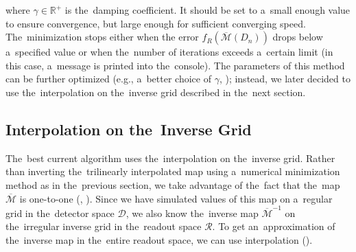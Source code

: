 			where $\gamma\in\mathbb{R}^+$ is the~damping coefficient. It should be set to a~small enough value to ensure convergence, but large enough for sufficient converging speed. The~minimization stops either when the error $f_R(\overbar{\mathcal{M}}(D_n))$ drops below a~specified value or when the~number of iterations exceeds a~certain limit (in this case, a~message is printed into the~console).
			The parameters of this method can be further optimized (e.g., a~better choice of $\gamma$, ); instead, we later decided to use the~interpolation on the~inverse grid described in the~next section.
			
		
		\subsection{Interpolation on the~Inverse Grid}
		\label{sec:interpol}			
			
			The~best current algorithm uses the~interpolation on the~inverse grid. Rather than inverting the~trilinearly interpolated map using a~numerical minimization method as in the~previous section, we take advantage of the~fact that the~map $\overbar{\mathcal{M}}$ is one-to-one (, ). Since we have simulated values of this map on a~regular grid in the~detector space $\mathcal{D}$, we also know the~inverse map $\overbar{\mathcal{M}}^{-1}$ on the~irregular inverse grid in the~readout space $\mathcal{R}$. To get an~approximation of the~inverse map in the~entire readout space, we can use interpolation ().
			
